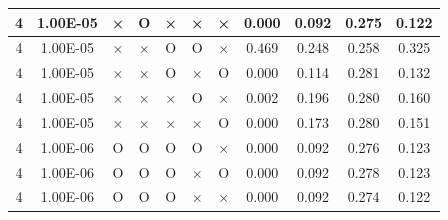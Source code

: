 \documentclass[11pt]{article}
\begin{document}
\begin{longtable}[h]{|r|r|l|l|l|l|l|r|r|l|r|}
\multicolumn{1}{|c|}{4} & \multicolumn{1}{c|}{1.00E-05} & \multicolumn{1}{c|}{×} & \multicolumn{1}{c|}{O} & \multicolumn{1}{c|}{×} & \multicolumn{1}{c|}{×} & \multicolumn{1}{c|}{×} & \multicolumn{1}{c|}{0.000} & \multicolumn{1}{c|}{0.092} & \multicolumn{1}{c|}{0.275} & \multicolumn{1}{c|}{0.122} \\ \hline
\multicolumn{1}{|c|}{4} & \multicolumn{1}{c|}{1.00E-05} & \multicolumn{1}{c|}{×} & \multicolumn{1}{c|}{×} & \multicolumn{1}{c|}{O} & \multicolumn{1}{c|}{O} & \multicolumn{1}{c|}{×} & \multicolumn{1}{c|}{0.469} & \multicolumn{1}{c|}{0.248} & \multicolumn{1}{c|}{0.258} & \multicolumn{1}{c|}{0.325} \\ \hline
\multicolumn{1}{|c|}{4} & \multicolumn{1}{c|}{1.00E-05} & \multicolumn{1}{c|}{×} & \multicolumn{1}{c|}{×} & \multicolumn{1}{c|}{O} & \multicolumn{1}{c|}{×} & \multicolumn{1}{c|}{O} & \multicolumn{1}{c|}{0.000} & \multicolumn{1}{c|}{0.114} & \multicolumn{1}{c|}{0.281} & \multicolumn{1}{c|}{0.132} \\ \hline
\multicolumn{1}{|c|}{4} & \multicolumn{1}{c|}{1.00E-05} & \multicolumn{1}{c|}{×} & \multicolumn{1}{c|}{×} & \multicolumn{1}{c|}{×} & \multicolumn{1}{c|}{O} & \multicolumn{1}{c|}{×} & \multicolumn{1}{c|}{0.002} & \multicolumn{1}{c|}{0.196} & \multicolumn{1}{c|}{0.280} & \multicolumn{1}{c|}{0.160} \\ \hline
\multicolumn{1}{|c|}{4} & \multicolumn{1}{c|}{1.00E-05} & \multicolumn{1}{c|}{×} & \multicolumn{1}{c|}{×} & \multicolumn{1}{c|}{×} & \multicolumn{1}{c|}{×} & \multicolumn{1}{c|}{O} & \multicolumn{1}{c|}{0.000} & \multicolumn{1}{c|}{0.173} & \multicolumn{1}{c|}{0.280} & \multicolumn{1}{c|}{0.151} \\ \hline
\multicolumn{1}{|c|}{4} & \multicolumn{1}{c|}{1.00E-06} & \multicolumn{1}{c|}{O} & \multicolumn{1}{c|}{O} & \multicolumn{1}{c|}{O} & \multicolumn{1}{c|}{O} & \multicolumn{1}{c|}{×} & \multicolumn{1}{c|}{0.000} & \multicolumn{1}{c|}{0.092} & \multicolumn{1}{c|}{0.276} & \multicolumn{1}{c|}{0.123} \\ \hline
\multicolumn{1}{|c|}{4} & \multicolumn{1}{c|}{1.00E-06} & \multicolumn{1}{c|}{O} & \multicolumn{1}{c|}{O} & \multicolumn{1}{c|}{O} & \multicolumn{1}{c|}{×} & \multicolumn{1}{c|}{O} & \multicolumn{1}{c|}{0.000} & \multicolumn{1}{c|}{0.092} & \multicolumn{1}{c|}{0.278} & \multicolumn{1}{c|}{0.123} \\ \hline
\multicolumn{1}{|c|}{4} & \multicolumn{1}{c|}{1.00E-06} & \multicolumn{1}{c|}{O} & \multicolumn{1}{c|}{O} & \multicolumn{1}{c|}{O} & \multicolumn{1}{c|}{×} & \multicolumn{1}{c|}{×} & \multicolumn{1}{c|}{0.000} & \multicolumn{1}{c|}{0.092} & \multicolumn{1}{c|}{0.274} & \multicolumn{1}{c|}{0.122} \\ \hline

\end{longtable}
\end{document}
